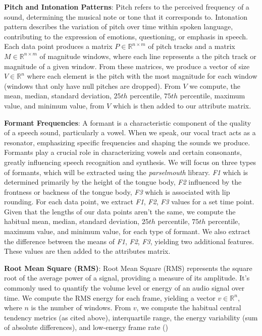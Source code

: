 \documentclass[twocolumn]{article}
\newcommand{\R}{\mathbb{R}}
\begin{document}
\textbf{Pitch and Intonation Patterns}: Pitch refers to the perceived frequency of a sound, determining the musical note or tone that it corresponds to. Intonation pattern describes the variation of pitch over time within spoken language, contributing to the expression of emotions, questioning, or emphasis in speech. Each data point produces a matrix $P \in \R^{n \times m}$ of pitch tracks and a matrix $M \in \R^{n \times m}$ of magnitude windows, where each line represents a the pitch track or magnitude of a given window. From these matrices, we produce a vector of size $V \in \R^{n}$ where each element is the pitch with the most magnitude for each window (windows that only have null pitches are dropped). From $V$ we compute, the mean, median, standard deviation, $25th$ percentile, $75th$ percentile, maximum value, and minimum value, from $V$ which is then added to our attribute matrix. 

\textbf{Formant Frequencies}: 
A formant is a characteristic component of the quality of a speech sound, particularly a vowel. When we speak, our vocal tract acts as a resonator, emphasizing specific frequencies and shaping the sounds we produce. Formants play a crucial role in characterizing vowels and certain consonants, greatly influencing speech recognition and synthesis. We will focus on three types of formants, which will be extracted using the \textit{parselmouth} library. \textit{F1} which is determined primarily by the height of the tongue body, \textit{F2} influenced by the frontness or backness of the tongue body,  \textit{F3} which is associated with lip rounding. For each data point, we extract \textit{F1}, \textit{F2}, \textit{F3} values for a set time point. Given that the lengths of our data points aren't the same, we compute the habitual mean, median, standard deviation, $25th$ percentile, $75th$ percentile, maximum value, and minimum value, for each type of formant. We also extract the difference between the means of \textit{F1}, \textit{F2}, \textit{F3}, yielding two additional features. These values are then added to the attributes matrix. 

\textbf{Root Mean Square (RMS)}: Root Mean Square (RMS) represents the square root of the average power of a signal, providing a measure of its amplitude. It's commonly used to quantify the volume level or energy of an audio signal over time. We compute the RMS energy for each frame, yielding a vector $v \in \R^{n}$, where $n$ is the number of windows. From $v$, we compute the habitual central tendency metrics (as cited above), interquartile range, the energy variability (sum of absolute differences), and low-energy frame rate ()
\end{document}
